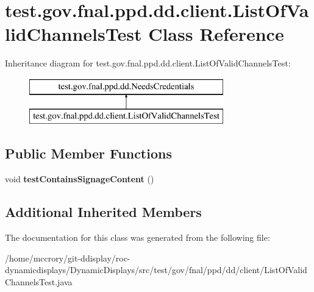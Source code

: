 \hypertarget{classtest_1_1gov_1_1fnal_1_1ppd_1_1dd_1_1client_1_1ListOfValidChannelsTest}{\section{test.\-gov.\-fnal.\-ppd.\-dd.\-client.\-List\-Of\-Valid\-Channels\-Test Class Reference}
\label{classtest_1_1gov_1_1fnal_1_1ppd_1_1dd_1_1client_1_1ListOfValidChannelsTest}
}
Inheritance diagram for test.\-gov.\-fnal.\-ppd.\-dd.\-client.\-List\-Of\-Valid\-Channels\-Test\-:\begin{figure}[H]
\begin{center}
\leavevmode
\includegraphics[height=2.000000cm]{classtest_1_1gov_1_1fnal_1_1ppd_1_1dd_1_1client_1_1ListOfValidChannelsTest}
\end{center}
\end{figure}
\subsection*{Public Member Functions}
\begin{DoxyCompactItemize}
\item 
\hypertarget{classtest_1_1gov_1_1fnal_1_1ppd_1_1dd_1_1client_1_1ListOfValidChannelsTest_a07ce50724c9048adc013081accbb99c4}{void {\bfseries test\-Contains\-Signage\-Content} ()}\label{classtest_1_1gov_1_1fnal_1_1ppd_1_1dd_1_1client_1_1ListOfValidChannelsTest_a07ce50724c9048adc013081accbb99c4}

\end{DoxyCompactItemize}
\subsection*{Additional Inherited Members}


The documentation for this class was generated from the following file\-:\begin{DoxyCompactItemize}
\item 
/home/mccrory/git-\/ddisplay/roc-\/dynamicdisplays/\-Dynamic\-Displays/src/test/gov/fnal/ppd/dd/client/List\-Of\-Valid\-Channels\-Test.\-java\end{DoxyCompactItemize}
